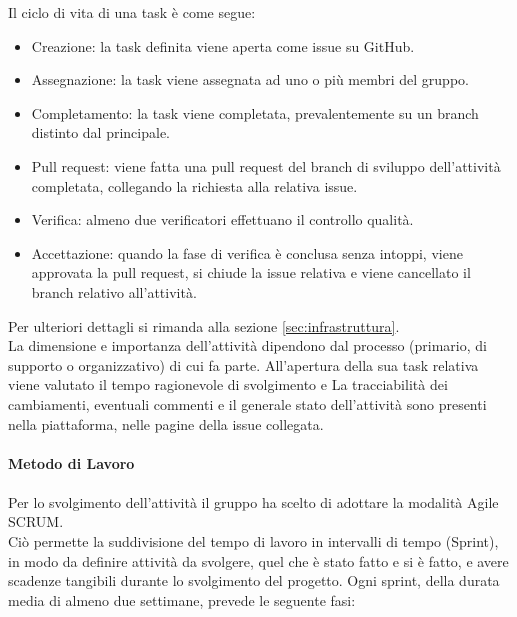 Il ciclo di vita di una task è come segue:
\begin{itemize}
  \item{Creazione: la task definita viene aperta come issue su GitHub.}
  \item{Assegnazione: la task viene assegnata ad uno o più membri del gruppo.}
  \item{Completamento: la task viene completata, prevalentemente su un branch distinto dal principale.}
  \item{Pull request: viene fatta una pull request del branch di sviluppo dell'attività completata, collegando la richiesta alla relativa issue.}
  \item{Verifica: almeno due verificatori effettuano il controllo qualità.}
  \item{Accettazione: quando la fase di verifica è conclusa senza intoppi, viene approvata la pull request, si chiude la issue relativa e viene cancellato il branch relativo all'attività.}
\end{itemize}
Per ulteriori dettagli si rimanda alla sezione \hyperref[sec:infrastruttura]{\ref{sec:infrastruttura}}.\\
La dimensione e importanza dell'attività dipendono dal processo (primario, di supporto o organizzativo) di cui fa parte. All'apertura della sua task relativa viene valutato il tempo ragionevole di svolgimento e 
La tracciabilità dei cambiamenti, eventuali commenti e il generale stato dell'attività sono presenti nella piattaforma, nelle pagine della issue collegata.
\\\\
\textbf{Metodo di Lavoro}
\\\\
Per lo svolgimento dell'attività il gruppo ha scelto di adottare la modalità Agile SCRUM.\\
Ciò permette la suddivisione del tempo di lavoro in intervalli di tempo (Sprint), in modo da definire attività da svolgere, quel che è stato fatto e si è fatto, e avere scadenze tangibili durante lo svolgimento del progetto.
Ogni sprint, della durata media di almeno due settimane, prevede le seguente fasi:
